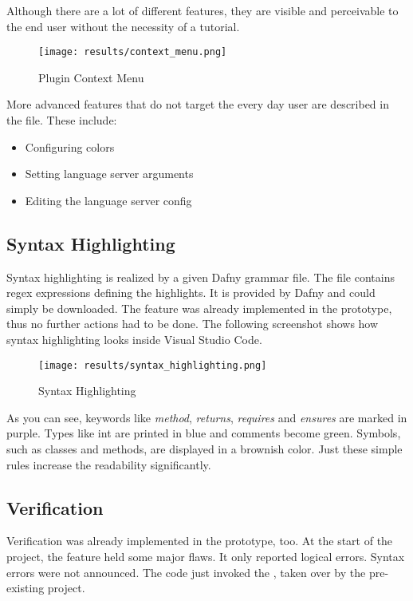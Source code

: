 Although there are a lot of different features, they are visible and perceivable to the end user without the necessity of a tutorial.

\begin{figure}[H]
    \centering
    \texttt{[image: results/context\_menu.png]}
    \caption{Plugin Context Menu}
    \label{fig:result_contextmenu}
\end{figure}

More advanced features that do not target the every day user are described in the  file.
These include:
\begin{itemize}
    \item Configuring colors
    \item Setting language server arguments
    \item Editing the language server config
\end{itemize}

\subsection{Syntax Highlighting}
\label{section:result:syntaxhighgliht}
Syntax highlighting is realized by a given Dafny grammar file.
The file contains regex expressions defining the highlights.
It is provided by Dafny  and could simply be downloaded.
The feature was already implemented in the prototype, thus no further actions had to be done.
The following screenshot shows how syntax highlighting looks inside Visual Studio Code.

\begin{figure}[H]
    \centering
    \texttt{[image: results/syntax\_highlighting.png]}
    \caption{Syntax Highlighting}
    \label{fig:result_syntax_highlight}
\end{figure}

As you can see, keywords like \textit{method}, \textit{returns}, \textit{requires} and \textit{ensures} are marked in purple.
Types like int are printed in blue and comments become green.
Symbols, such as classes and methods, are displayed in a brownish color.
Just these simple rules increase the readability significantly.


\subsection{Verification}
Verification was already implemented in the prototype, too.
At the start of the project, the feature held some major flaws.
It only reported logical errors.
Syntax errors were not announced.
The code just invoked the , taken over by the pre-existing project.\\


